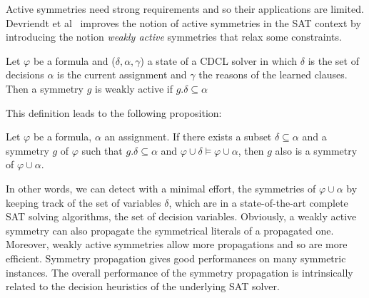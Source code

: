 Active symmetries need strong requirements and so their applications are limited.
Devriendt et al~\cite{Devriendt12} improves the notion of active symmetries in the SAT context by
introducing the notion \emph{weakly active} symmetries that relax some constraints.
\begin{definition}
 \label{def:weakly_active_symmetry}
 Let $\varphi$ be a formula and ($\delta, \alpha, \gamma$) a state of a CDCL solver in which $\delta$ is the set of decisions
 $\alpha$ is the current assignment and $\gamma$ the reasons of the learned clauses. Then a symmetry $g$ is weakly active 
 if $g.\delta \subseteq \alpha$
\end{definition}
This definition leads to the following proposition:
\begin{proposition}
 Let $\varphi$ be a formula, $\alpha $ an assignment. If
 there exists a subset $\delta \subseteq \alpha $ and a symmetry $g$ of $\varphi$ such that 
 $g.\delta \subseteq \alpha $ and $\varphi \cup \delta \models \varphi \cup \alpha$, then $g$ 
 also is a symmetry of $\varphi \cup \alpha $.
\end{proposition}

In other words, we can detect with a minimal effort, the symmetries of $\varphi
\cup \alpha$ by keeping track of the set of variables $\delta$, which are 
in a state-of-the-art complete SAT solving algorithms, the set of decision variables.
Obviously, a weakly active symmetry can also propagate the symmetrical literals of a propagated one.
Moreover, weakly active symmetries allow more propagations and so are more efficient.
Symmetry propagation gives good performances on many symmetric instances.
The overall performance of the symmetry propagation is intrinsically related to the decision heuristics of the underlying SAT solver.
